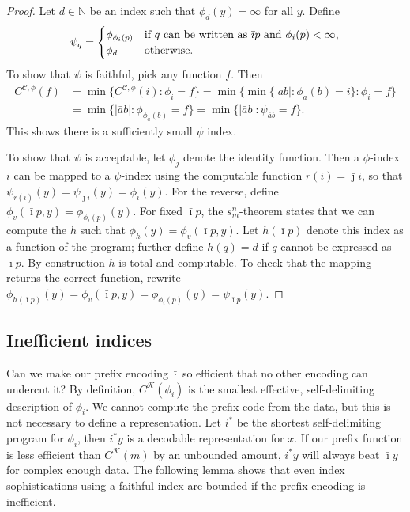 \documentclass{style/llncs}
\newcommand{\C}{\mathscr C}
\newcommand{\K}{\mathscr K}
\newcommand{\N}{\mathbb N}
\newcommand{\tn}[1]{\textnormal{#1}}
\begin{document}
\begin{proof}
Let $d \in \N$ be an index such that $\phi_d(y)=\infty$ for all $y$. Define
  \[\psi_q=\begin{cases}
    \phi_{\phi_i(p)}&\tn{if $q$ can be written as $\bar\imath p$ and $\phi_i(p)<\infty$,}\\
    \phi_d&\tn{otherwise.}\end{cases}
  \]
  To show that $\psi$ is faithful, pick any function $f$. Then
\[\begin{split}
C^{\C, \phi}(f)&=\min\{C^{\C, \phi}(i):\phi_i=f\} =\min\{\min\{|\bar a b|:\phi_a(b)=i\}:\phi_i=f\} \\
& =\min\{|\bar a b|:\phi_{\phi_a(b)}=f\}
 =\min\{|\bar a b|:\psi_{\bar a b}=f\}.
\end{split}\]
This shows there is a sufficiently small $\psi$ index.

To show that $\psi$ is acceptable, let $\phi_j$ denote the identity
function. Then a $\phi$-index $i$ can be mapped to a $\psi$-index
using the computable function $r(i)=\bar\jmath i$, so that
$\psi_{r(i)}(y)=\psi_{\bar\jmath i}(y)=\phi_i(y)$. For the reverse,
define $\phi_v(\bar\imath p, y)=\phi_{\phi_i(p)}(y)$. For fixed
$\bar\imath p$, the 
$s^n_m$-theorem \cite{kleene193notation} states that we can compute the $h$
such that $\phi_h(y)=\phi_v(\bar\imath p,y)$. Let $h(\bar\imath p)$
denote this index as a function of the program; further define
$h(q)=d$ if $q$ cannot be expressed as $\bar\imath p$. By
construction $h$ is total and computable. To check that the mapping
returns the correct function, rewrite $\phi_{h(\bar\imath
  p)}(y)=\phi_v(\bar\imath p,y)=\phi_{\phi_i(p)}(y)=\psi_{\bar\imath p}(y)$.
\end{proof}

\subsection{Inefficient indices}
\label{section:appendix-inefficient-indices}

Can we make our prefix encoding $\bar\cdot$ so efficient that no other encoding can undercut it? By definition, $C^{\K}(\phi_i)$ is the smallest effective, self-delimiting description of $\phi_i$. We cannot compute the prefix code from the data, but this is not necessary to define a representation. Let $i^*$ be the shortest self-delimiting program for $\phi_i$, then $i^*y$ is a decodable representation for $x$. If our prefix function is less efficient than $C^\K(m)$ by an unbounded amount, $i^*y$ will always beat $\bar\imath y$ for complex enough data. 
The following lemma shows that even index sophistications using a faithful index are bounded if the prefix encoding is inefficient.
\end{document}
